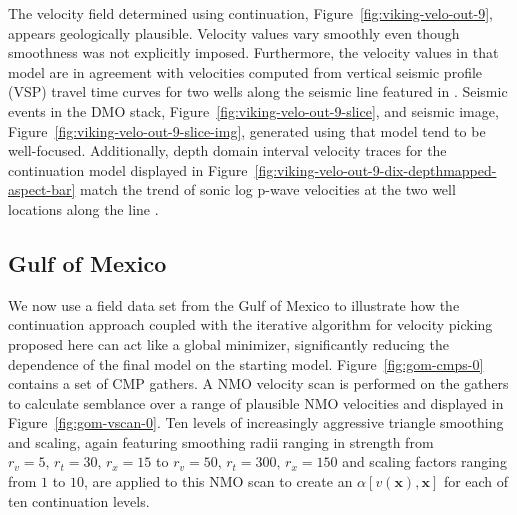 
The velocity field determined using continuation, Figure~\ref{fig:viking-velo-out-9}, appears geologically plausible.  Velocity values vary smoothly even though smoothness was not explicitly imposed.  Furthermore, the velocity values in that model are in agreement with velocities computed from vertical seismic profile (VSP)  travel time curves for two wells along the seismic line featured in \cite{vikingdata}.  Seismic events in the DMO stack, Figure~\ref{fig:viking-velo-out-9-slice}, and seismic image, Figure~\ref{fig:viking-velo-out-9-slice-img}, generated using that model tend to be well-focused.  Additionally, depth domain interval velocity traces for the continuation model displayed in Figure~\ref{fig:viking-velo-out-9-dix-depthmapped-aspect-bar}  match the trend of sonic log p-wave velocities at the two well locations along the line \cite[]{vikingdata}.


\subsection{Gulf of Mexico}
We now use a field data set from the Gulf of Mexico to illustrate how the continuation approach coupled with the iterative algorithm for velocity picking proposed here can act like a global minimizer, significantly reducing the dependence of the final model on the starting model. Figure~\ref{fig:gom-cmps-0} contains a set of CMP gathers.  A NMO velocity scan is performed on the gathers to calculate semblance over a range of plausible NMO velocities and displayed in Figure~\ref{fig:gom-vscan-0}.  Ten levels of increasingly aggressive triangle smoothing and scaling, again featuring smoothing radii ranging in strength from $r_v=5,\,r_t=30,\,r_x=15$ to $r_v=50,\,r_t=300,\,r_x=150$ and scaling factors ranging from $1$ to $10$, are applied to this NMO scan to create an $\alpha[v(\mathbf{x}),\mathbf{x}]$ for each of ten continuation levels. 


